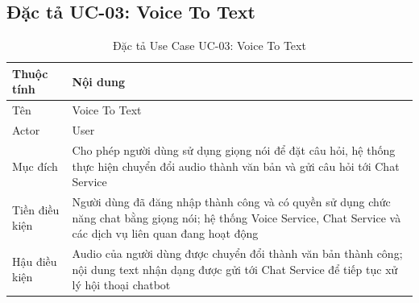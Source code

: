 \documentclass[../DoAn.tex]{subfiles}
\begin{document}
\subsection{Đặc tả UC-03: Voice To Text}
\begin{table}[htbp]
    \centering
    \renewcommand{\arraystretch}{1.4}
    \begin{tabular}{|l|p{10cm}|}
        \hline
        \textbf{Thuộc tính} & \textbf{Nội dung}                                                                                                                                                  \\
        \hline
        Tên                 & Voice To Text                                                                                                                                                      \\
        \hline
        Actor               & User                                                                                                                                                               \\
        \hline
        Mục đích            & Cho phép người dùng sử dụng giọng nói để đặt câu hỏi, hệ thống thực hiện chuyển đổi audio thành văn bản và gửi câu hỏi tới Chat Service                            \\
        \hline
        Tiền điều kiện      & Người dùng đã đăng nhập thành công và có quyền sử dụng chức năng chat bằng giọng nói; hệ thống Voice Service, Chat Service và các dịch vụ liên quan đang hoạt động \\
        \hline
        Hậu điều kiện       & Audio của người dùng được chuyển đổi thành văn bản thành công; nội dung text nhận dạng được gửi tới Chat Service để tiếp tục xử lý hội thoại chatbot               \\
        \hline
    \end{tabular}
    \caption{Đặc tả Use Case UC-03: Voice To Text}
    \label{tab:usecase-voice-to-text}
\end{table}
\end{document}
